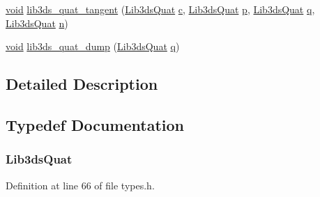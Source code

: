 \begin{DoxyCompactItemize}
\item 
\hyperlink{group___u_a_v_objects_plugin_ga444cf2ff3f0ecbe028adce838d373f5c}{void} \hyperlink{group__quat_ga1e8314c0c61255f580f0d76b921d6231}{lib3ds\-\_\-quat\-\_\-tangent} (\hyperlink{group__quat_ga9969ef1e618ba698c4b8374f14b548be}{Lib3ds\-Quat} \hyperlink{glext_8h_a1f2d7f8147412c43ba2303a56f97ee73}{c}, \hyperlink{group__quat_ga9969ef1e618ba698c4b8374f14b548be}{Lib3ds\-Quat} \hyperlink{glext_8h_aa5367c14d90f462230c2611b81b41d23}{p}, \hyperlink{group__quat_ga9969ef1e618ba698c4b8374f14b548be}{Lib3ds\-Quat} \hyperlink{glext_8h_afb30bc844faa48275d1c84294956a44b}{q}, \hyperlink{group__quat_ga9969ef1e618ba698c4b8374f14b548be}{Lib3ds\-Quat} \hyperlink{glext_8h_a4eacae1d9e7c39f8236bb36d4ececa77}{n})
\item 
\hyperlink{group___u_a_v_objects_plugin_ga444cf2ff3f0ecbe028adce838d373f5c}{void} \hyperlink{group__quat_gae7cb6ee37ff8074e61e6dec4ef9df239}{lib3ds\-\_\-quat\-\_\-dump} (\hyperlink{group__quat_ga9969ef1e618ba698c4b8374f14b548be}{Lib3ds\-Quat} \hyperlink{glext_8h_afb30bc844faa48275d1c84294956a44b}{q})
\end{DoxyCompactItemize}


\subsection{Detailed Description}


\subsection{Typedef Documentation}
\hypertarget{group__quat_ga9969ef1e618ba698c4b8374f14b548be}{
\subsubsection[{Lib3ds\-Quat}]{\setlength{\rightskip}{0pt plus 5cm}Lib3ds\-Quat}}\label{group__quat_ga9969ef1e618ba698c4b8374f14b548be}


Definition at line 66 of file types.\-h.



